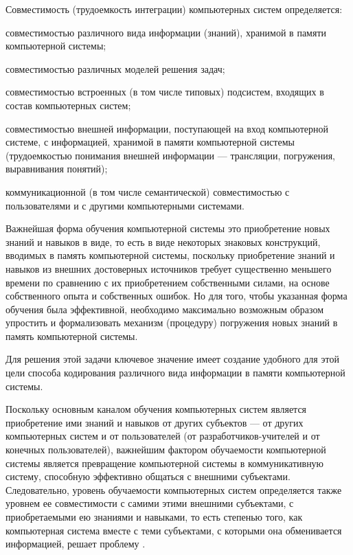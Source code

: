 Совместимость (трудоемкость интеграции) компьютерных систем определяется:
\begin{textitemize}
    \item совместимостью различного вида информации (знаний), хранимой в памяти компьютерной системы;
    \item совместимостью различных моделей решения задач;
    \item совместимостью встроенных (в том числе типовых) подсистем, входящих в состав компьютерных систем;
    \item совместимостью внешней информации, поступающей на вход компьютерной системе, с информацией, хранимой в памяти компьютерной системы (трудоемкостью понимания внешней информации --- трансляции, погружения, выравнивания понятий);
    \item коммуникационной (в том числе семантической) совместимостью с пользователями и с другими компьютерными системами.
\end{textitemize}

Важнейшая форма обучения компьютерной системы это приобретение новых знаний и навыков в  виде, то есть в виде некоторых знаковых конструкций, вводимых в память компьютерной системы, поскольку приобретение знаний и навыков из внешних достоверных источников требует существенно меньшего времени по сравнению с их приобретением собственными силами, на основе собственного опыта и собственных ошибок. Но для того, чтобы указанная форма обучения была эффективной, необходимо максимально возможным образом упростить и формализовать механизм (процедуру) погружения новых знаний в память компьютерной системы.

Для решения этой задачи ключевое значение имеет создание удобного для этой цели способа кодирования различного вида информации в памяти компьютерной системы.

Поскольку основным каналом обучения компьютерных систем является приобретение ими знаний и навыков от других субъектов --- от других компьютерных систем и от пользователей (от разработчиков-учителей и от конечных пользователей), важнейшим фактором обучаемости компьютерной системы является превращение компьютерной системы в коммуникативную систему, способную эффективно общаться с внешними субъектами. Следовательно, уровень обучаемости компьютерных систем определяется также уровнем ее совместимости с самими этими внешними субъектами, с приобретаемыми ею знаниями и навыками, то есть степенью того, как компьютерная система вместе с теми субъектами, с которыми она обменивается информацией, решает проблему .

